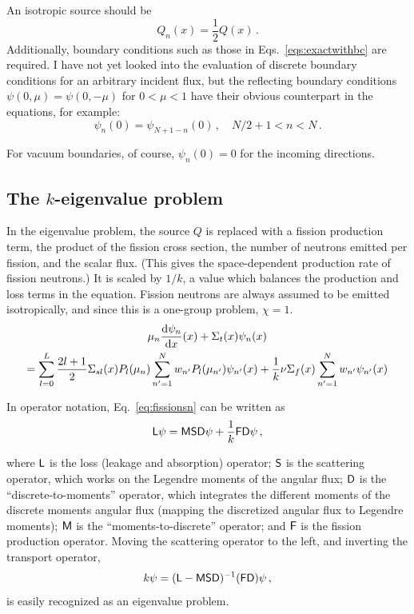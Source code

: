 \documentclass[]{SRJcommon}
\begin{document}
An isotropic source should be 
\begin{equation}
Q_n(x) = \frac{1}{2} Q(x) \,.
  \label{eq:isotropicsource}
\end{equation}
Additionally, boundary conditions such as those in
Eqs.~\eqref{eqs:exactwithbc} are required. I have not yet looked into the
evaluation of discrete boundary conditions for an arbitrary incident flux, but
the reflecting boundary conditions $\psi(0, \mu) = \psi(0, -\mu)$ for $0 < \mu
< 1$ have their obvious counterpart in the \SN{} equations, for example:
$$ \psi_{n}(0) = \psi_{N + 1 - n}(0) \,, \quad N/2 + 1 < n < N  \,.$$

For vacuum boundaries, of course, $\psi_{n}(0) = 0$ for the incoming directions.
\subsection{The $k$-eigenvalue problem}
In the eigenvalue problem, the source $Q$ is replaced with a fission production
term, the product of the fission cross section, the number of neutrons emitted
per fission, and the scalar flux. (This gives the space-dependent production
rate of fission neutrons.)
It is scaled by $1/k$, a value which balances the production and loss
terms in the equation. Fission neutrons are always assumed to be emitted
isotropically, and since this is a one-group problem, $\chi = 1$. 
\begin{multline}
  \mu_n \frac{\mathrm{d} \psi_n}{\mathrm{d} x}(x) + \Sigma_t(x) \psi_n(x) 
\\
  = \sum_{l=0}^{L}  \frac{2l+1}{2} \Sigma_{sl}(x) P_{l}(\mu_n)
  \sum_{n'=1}^{N} w_{n'} P_{l} (\mu_{n'}) \psi_{n'}(x)
  + \frac{1}{k} \nu\Sigma_f(x) \sum_{n'=1}^{N} w_{n'} \psi_{n'}(x)
  \label{eq:fissionsn}
\end{multline}

In operator notation, Eq.~\eqref{eq:fissionsn} can be
written as
\begin{equation}
\mathsf{L} \psi = \mathsf{M} \mathsf{S} \mathsf{D} \psi +  \frac{1}{k} \mathsf{F} \mathsf{D} \psi \,,
  \label{eq:fissionoperator}
\end{equation}

where $\mathsf{L}$ is the loss (leakage and absorption) operator; 
$\mathsf{S}$ is the scattering operator, which works on the Legendre moments of
the angular flux; $\mathsf{D}$ is the ``discrete-to-moments'' operator, which
integrates
the different moments of the discrete moments angular flux (mapping the
discretized angular flux to Legendre moments); $\mathsf{M}$ is the
``moments-to-discrete'' operator; and $\mathsf{F}$ is the
fission production operator. Moving the scattering operator to the left, and
inverting the transport operator,
$$ k \psi = (\mathsf{L} - \mathsf{M} \mathsf{S} \mathsf{D} )^{-1}  (\mathsf{F} \mathsf{D}) \psi \,,$$
is easily recognized as an eigenvalue problem.
\end{document}
